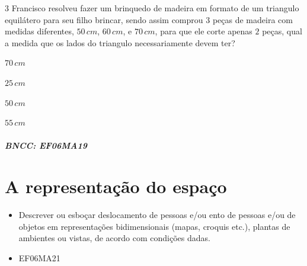 \num{3}  Francisco resolveu fazer um brinquedo de madeira em formato de um
triangulo equilátero para seu filho brincar, sendo assim comprou $3$ peças
de madeira com medidas diferentes, $50\,cm$, $60\,cm$, e $70\,cm$, para que ele
corte apenas $2$ peças, qual a medida que os lados do triangulo
necessariamente devem ter?

\begin{escolha}
\item $70\,cm$
\item $25\,cm$
\item $50\,cm$
\item $55\,cm$
\end{escolha}

\paragraph{BNCC: EF06MA19 }


\chapter{A representação do espaço}

\begin{itemize}
\item Descrever ou esboçar deslocamento de pessoas e/ou
ento de pessoas e/ou de objetos em representações bidimensionais (mapas, croquis etc.),
plantas de ambientes ou vistas, de acordo com condições dadas.
\end{itemize}

\begin{itemize}
\item EF06MA21
\end{itemize}

